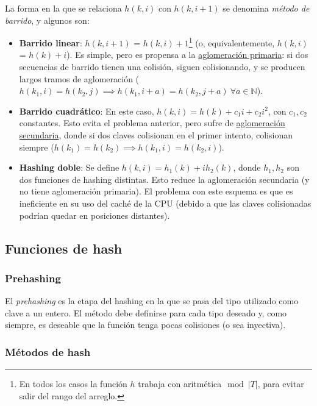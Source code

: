 \documentclass{article}
\begin{document}
La forma en la que se relaciona $h(k, i)$ con $h(k, i + 1)$ se denomina \textit{método de barrido}, y algunos son:
\begin{itemize}
    \item \textbf{Barrido linear}: $h(k, i + 1)$ = $h(k, i) + 1$\footnote{En todos los casos la función $h$ trabaja con aritmética$\mod{|T|}$, para evitar salir del rango del arreglo.} (o, equivalentemente, $h(k, i)$ = $h(k) + i$). Es simple, pero es propensa a la \underline{aglomeración primaria}: si dos secuencias de barrido tienen una colisión, siguen colisionando, y se producen largos tramos de aglomeración ($h(k_1, i) = h(k_2, j) \implies h(k_1, i + a) = h(k_2, j + a) \ \forall a \in \mathbb{N}$).
    \item \textbf{Barrido cuadrático}: En este caso, $h(k, i) = h(k) + c_1 i + c_2 i^2$, con $c_1, c_2$ constantes. Esto evita el problema anterior, pero sufre de \underline{aglomeración secundaria}, donde si dos claves colisionan en el primer intento, colisionan siempre ($h(k_1) = h(k_2) \implies h(k_1, i) = h(k_2, i) $).
    \item \textbf{Hashing doble}: Se define $h(k, i) = h_1(k) + i h_2(k)$, donde $h_1, h_2$ son dos funciones de hashing distintas. Esto reduce la aglomeración secundaria (y no tiene aglomeración primaria). El problema con este esquema es que es ineficiente en su uso del caché de la CPU (debido a que las claves colisionadas podrían quedar en posiciones distantes).
\end{itemize}

\subsection{Funciones de hash}

\subsubsection{Prehashing}

El \textit{prehashing} es la etapa del hashing en la que se pasa del tipo utilizado como clave a un entero. El método debe definirse para cada tipo deseado y, como siempre, es deseable que la función tenga pocas colisiones (o sea inyectiva).

\subsubsection{Métodos de hash}
\end{document}
